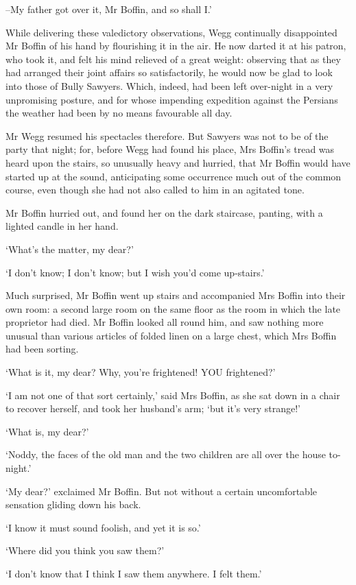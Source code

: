--My father got over it, Mr Boffin, and so shall I.’

While delivering these valedictory observations, Wegg continually
disappointed Mr Boffin of his hand by flourishing it in the air. He now
darted it at his patron, who took it, and felt his mind relieved of a
great weight: observing that as they had arranged their joint affairs
so satisfactorily, he would now be glad to look into those of Bully
Sawyers. Which, indeed, had been left over-night in a very unpromising
posture, and for whose impending expedition against the Persians the
weather had been by no means favourable all day.

Mr Wegg resumed his spectacles therefore. But Sawyers was not to be of
the party that night; for, before Wegg had found his place, Mrs Boffin’s
tread was heard upon the stairs, so unusually heavy and hurried, that Mr
Boffin would have started up at the sound, anticipating some occurrence
much out of the common course, even though she had not also called to
him in an agitated tone.

Mr Boffin hurried out, and found her on the dark staircase, panting,
with a lighted candle in her hand.

‘What’s the matter, my dear?’

‘I don’t know; I don’t know; but I wish you’d come up-stairs.’

Much surprised, Mr Boffin went up stairs and accompanied Mrs Boffin into
their own room: a second large room on the same floor as the room in
which the late proprietor had died. Mr Boffin looked all round him,
and saw nothing more unusual than various articles of folded linen on a
large chest, which Mrs Boffin had been sorting.

‘What is it, my dear? Why, you’re frightened! YOU frightened?’

‘I am not one of that sort certainly,’ said Mrs Boffin, as she sat down
in a chair to recover herself, and took her husband’s arm; ‘but it’s
very strange!’

‘What is, my dear?’

‘Noddy, the faces of the old man and the two children are all over the
house to-night.’

‘My dear?’ exclaimed Mr Boffin. But not without a certain uncomfortable
sensation gliding down his back.

‘I know it must sound foolish, and yet it is so.’

‘Where did you think you saw them?’

‘I don’t know that I think I saw them anywhere. I felt them.’

